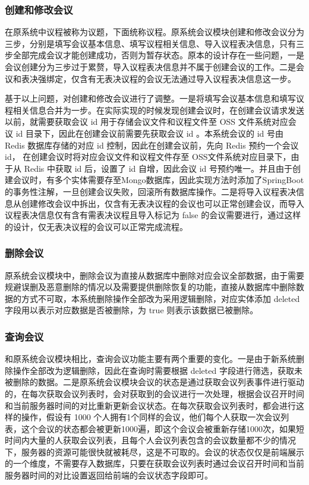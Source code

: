 \subsubsection{创建和修改会议}
在原系统中议程被称为议题，下面统称议程。原系统会议模块创建和修改会议分为三步，分别是填写会议基本信息、填写议程相关信息、导入议程表决信息，只有三步全部完成会议才能创建成功，否则为暂存状态。原本的设计存在一些问题，一是会议创建分为三步过于累赘，导入议程表决信息并不属于创建会议的工作。二是会议和表决强绑定，仅含有无表决议程的会议无法通过导入议程表决信息这一步。

基于以上问题，对创建和修改会议进行了调整。一是将填写会议基本信息和填写议程相关信息合并为一步。在实际实现的时候发现创建会议时，在创建会议请求发送以前，就需要获取会议 id 用于存储会议文件和议程文件至 OSS 文件系统对应会议 id 目录下，因此在创建会议前需要先获取会议 id 。本系统会议的 id 号由 Redis 数据库存储的对应 id 控制，因此在创建会议前，先向 Redis 预约一个会议 id， 在创建会议时将对应会议文件和议程文件存至 OSS文件系统对应目录下，由于从 Redis 中获取 id 后，设置了 id 自增，因此会议 id 号预约唯一。并且由于创建会议时，有多个实体需要存至Mongo数据库，因此实现方法时添加了SpringBoot 的事务性注解，一旦创建会议失败，回滚所有数据库操作。二是将导入议程表决信息从创建修改会议中拆出，仅含有无表决议程的会议也可以正常创建会议，而导入议程表决信息仅有含有需表决议程且导入标记为 false 的会议需要进行，通过这样的设计，仅无表决议程的会议可以正常完成流程。

\subsubsection{删除会议}
原系统会议模块中，删除会议为直接从数据库中删除对应会议全部数据，由于需要规避误删及恶意删除的情况以及需要提供删除恢复的功能，直接从数据库中删除数据的方式不可取，本系统删除操作全部改为采用逻辑删除，对应实体添加 deleted 字段用以表示对应数据是否被删除，为 true 则表示该数据已被删除。

\subsubsection{查询会议}
和原系统会议模块相比，查询会议功能主要有两个重要的变化。一是由于新系统删除操作全部改为逻辑删除，因此在查询时需要根据 deleted 字段进行筛选，获取未被删除的数据。二是原系统会议模块会议的状态是通过获取会议列表事件进行驱动的，在每次获取会议列表时，会对获取到的会议进行一次处理，根据会议召开时间和当前服务器时间的对比重新更新会议状态。在每次获取会议列表时，都会进行这样的操作，假设有 1000 个人拥有1个同样的会议，他们每个人获取一次会议列表，这个会议的状态都会被更新1000遍，即这个会议会被重新存储1000次，如果短时间内大量的人获取会议列表，且每个人会议列表包含的会议数量都不少的情况下，服务器的资源可能很快就被耗尽，这是不可取的。会议的状态仅仅是前端展示的一个维度，不需要存入数据库，只要在获取会议列表时通过会议召开时间和当前服务器时间的对比设置返回给前端的会议状态字段即可。

